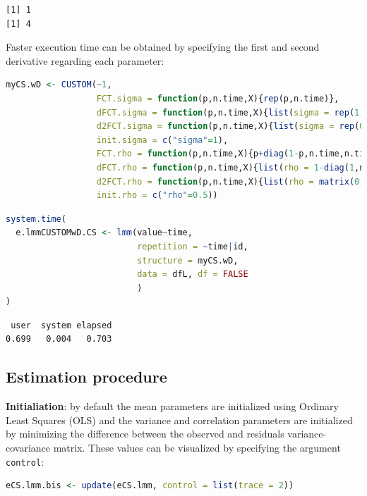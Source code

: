 \documentclass[12pt]{article}
\begin{document}
\label{}
\begin{verbatim}
[1] 1
[1] 4
\end{verbatim}


Faster execution time can be obtained by specifying the first and
second derivative regarding each parameter:
\begin{lstlisting}[language=r,numbers=none]
myCS.wD <- CUSTOM(~1,
                  FCT.sigma = function(p,n.time,X){rep(p,n.time)},
                  dFCT.sigma = function(p,n.time,X){list(sigma = rep(1,n.time))},
                  d2FCT.sigma = function(p,n.time,X){list(sigma = rep(0,n.time))},
                  init.sigma = c("sigma"=1),
                  FCT.rho = function(p,n.time,X){p+diag(1-p,n.time,n.time)},
                  dFCT.rho = function(p,n.time,X){list(rho = 1-diag(1,n.time,n.time))},
                  d2FCT.rho = function(p,n.time,X){list(rho = matrix(0,n.time,n.time))},
                  init.rho = c("rho"=0.5))
\end{lstlisting}

\begin{lstlisting}[language=r,numbers=none]
system.time(
  e.lmmCUSTOMwD.CS <- lmm(value~time,
                          repetition = ~time|id,
                          structure = myCS.wD, 
                          data = dfL, df = FALSE
                          )
)
\end{lstlisting}

\label{}
\begin{verbatim}
 user  system elapsed 
0.699   0.004   0.703
\end{verbatim}



\clearpage
\subsection{Estimation procedure}
\label{sec:org37a19e0}

\textbf{Initialiation}: by default the mean parameters are initialized using
 Ordinary Least Squares (OLS) and the variance and correlation
 parameters are initialized by minimizing the difference between the
 observed and residuals variance-covariance matrix. These values can
 be visualized by specifying the argument \texttt{control}:
\begin{lstlisting}[language=r,numbers=none]
eCS.lmm.bis <- update(eCS.lmm, control = list(trace = 2))
\end{lstlisting}
\end{document}
